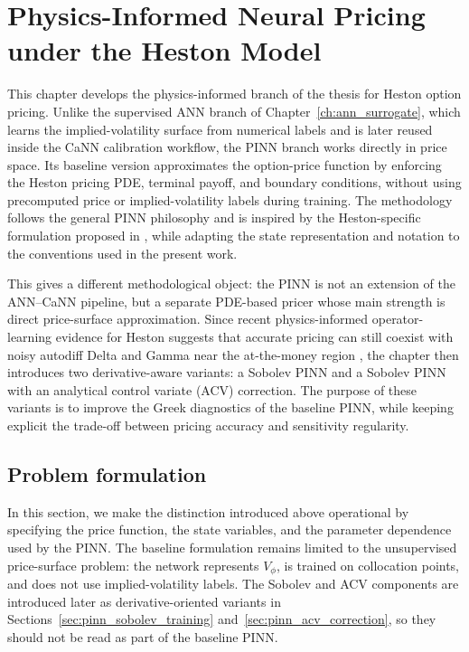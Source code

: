 \chapter{Physics-Informed Neural Pricing under the Heston Model}
\label{ch:pinn_greeks}

This chapter develops the physics-informed branch of the thesis for Heston option pricing. Unlike the supervised ANN branch of Chapter~\ref{ch:ann_surrogate}, which learns the implied-volatility surface from numerical labels and is later reused inside the CaNN calibration workflow, the PINN branch works directly in price space. Its baseline version approximates the option-price function by enforcing the Heston pricing PDE, terminal payoff, and boundary conditions, without using precomputed price or implied-volatility labels during training. The methodology follows the general PINN philosophy and is inspired by the Heston-specific formulation proposed in \cite{hainaut2024pinn}, while adapting the state representation and notation to the conventions used in the present work.

This gives a different methodological object: the PINN is not an extension of the ANN--CaNN pipeline, but a separate PDE-based pricer whose main strength is direct price-surface approximation. Since recent physics-informed operator-learning evidence for Heston suggests that accurate pricing can still coexist with noisy autodiff Delta and Gamma near the at-the-money region \cite{malandain2025deepsvm}, the chapter then introduces two derivative-aware variants: a Sobolev PINN and a Sobolev PINN with an analytical control variate (ACV) correction. The purpose of these variants is to improve the Greek diagnostics of the baseline PINN, while keeping explicit the trade-off between pricing accuracy and sensitivity regularity.

\section{Problem formulation}

In this section, we make the distinction introduced above operational by specifying the price function, the state variables, and the parameter dependence used by the PINN. The baseline formulation remains limited to the unsupervised price-surface problem: the network represents \(V_\phi\), is trained on collocation points, and does not use implied-volatility labels. The Sobolev and ACV components are introduced later as derivative-oriented variants in Sections~\ref{sec:pinn_sobolev_training} and~\ref{sec:pinn_acv_correction}, so they should not be read as part of the baseline PINN.

